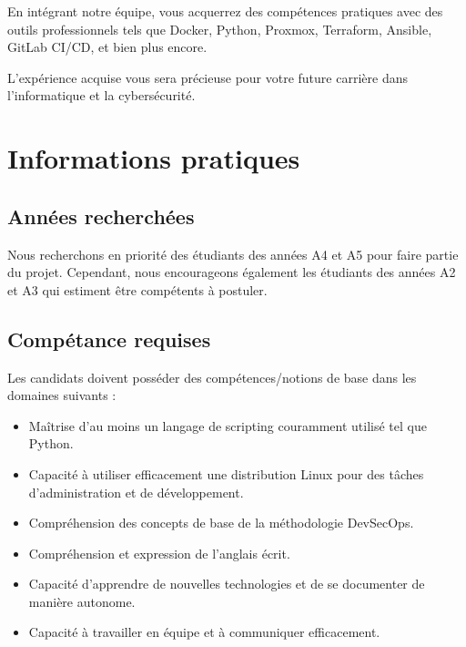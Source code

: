\documentclass[12pt]{article}
\begin{document}
	\noindent En intégrant notre équipe, vous acquerrez des compétences pratiques avec des outils professionnels tels que Docker, Python, Proxmox, Terraform, Ansible, GitLab CI/CD, et bien plus encore.
	
	\bigskip
	
	\noindent L'expérience acquise vous sera précieuse pour votre future carrière dans l'informatique et la cybersécurité.
	
	
	
	\section{Informations pratiques}
	\subsection{Années recherchées}
	Nous recherchons en priorité des étudiants des années A4 et A5 pour faire partie du projet. Cependant, nous encourageons également les étudiants des années A2 et A3 qui estiment être compétents à postuler.
	\subsection{Compétance requises}
	Les candidats doivent posséder des compétences/notions de base dans les domaines suivants :
	\begin{itemize}
		\setlength\itemsep{0pt}
		\item Maîtrise d'au moins un langage de scripting couramment utilisé tel que Python.
		\item Capacité à utiliser efficacement une distribution Linux pour des tâches d'administration et de développement.
		\item Compréhension des concepts de base de la méthodologie DevSecOps.
		\item Compréhension et expression de l'anglais écrit.
		\item Capacité d'apprendre de nouvelles technologies et de se documenter de manière autonome.
		\item Capacité à travailler en équipe et à communiquer efficacement.
		
	\end{itemize}
	
\end{document}
